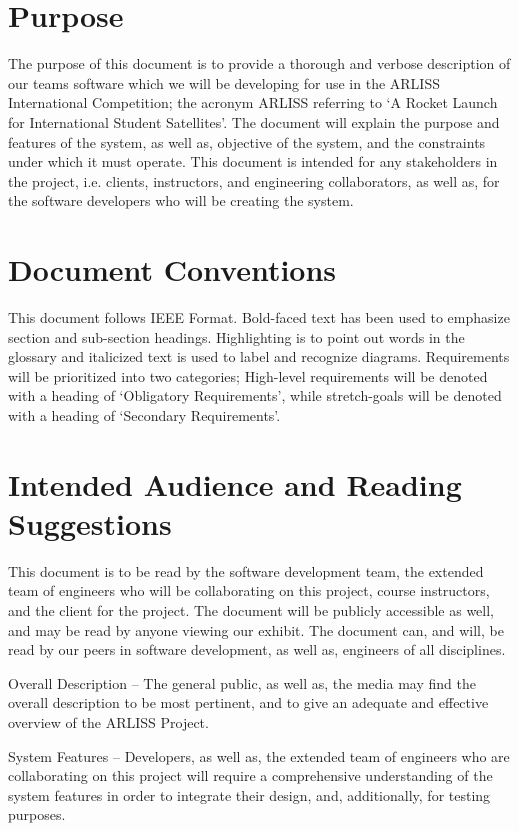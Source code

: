 \documentclass{scrreprt}
\begin{document}
\section{Purpose}
The purpose of this document is to provide a thorough and verbose description of our teams software which we will be developing for use in the ARLISS International Competition; the acronym ARLISS referring to ‘A Rocket Launch for International Student Satellites’. The document will explain the purpose and features of the system, as well as, objective of the system, and the constraints under which it must operate. This document is intended for any stakeholders in the project, i.e. clients, instructors, and engineering collaborators, as well as, for the software developers who will be creating the system.

\section{Document Conventions}
This document follows IEEE Format. Bold-faced text has been used to emphasize section and sub-section headings. Highlighting is to point out words in the glossary and italicized text is used to label and recognize diagrams. Requirements will be prioritized into two categories; High-level requirements will be denoted with a heading of ‘Obligatory Requirements’, while stretch-goals will be denoted with a heading of ‘Secondary Requirements’.

\section{Intended Audience and Reading Suggestions}
This document is to be read by the software development team, the extended team of engineers who will be collaborating on this project, course instructors, and the client for the project. The document will be publicly accessible as well, and may be read by anyone viewing our exhibit. The document can, and will, be read by our peers in software development, as well as, engineers of all disciplines. 

Overall Description – The general public, as well as, the media may find the overall description to be most pertinent, and to give an adequate and effective overview of the ARLISS Project.

System Features – Developers, as well as, the extended team of engineers who are collaborating on this project will require a comprehensive understanding of the system features in order to integrate their design, and, additionally, for testing purposes.
\end{document}
